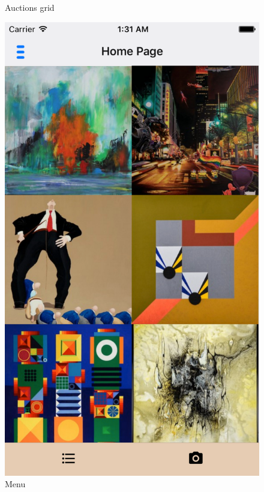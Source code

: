 \begin{figure}[H]
\begin{minipage}[b]{0.285\linewidth}
    \caption{Auctions grid}
    \includegraphics[width=\linewidth]{Appendix/VerticalPrototype/grid.png}
  \end{minipage}
 \hspace{0.6cm}
  \begin{minipage}[b]{0.285\linewidth}
    \caption{Menu}

\end{minipage}
\end{figure}
